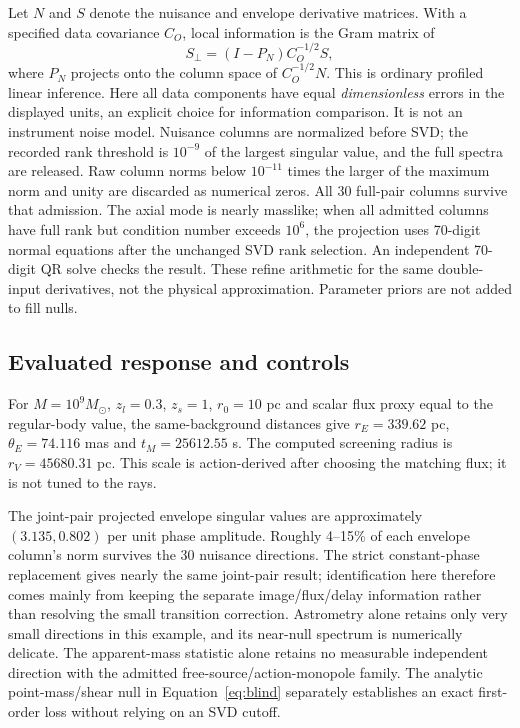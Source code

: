 \documentclass[11pt,a4paper]{article}
\begin{document}
Let $N$ and $S$ denote the nuisance and envelope derivative matrices.
With a specified data covariance $C_O$, local information is the Gram
matrix of
\begin{equation}
 S_\perp=(I-P_N)C_O^{-1/2}S,
\end{equation}
where $P_N$ projects onto the column space of $C_O^{-1/2}N$.
This is ordinary profiled linear inference. Here all data components
have equal \emph{dimensionless} errors in the displayed units, an
explicit choice for information comparison. It is not an instrument
noise model. Nuisance columns are normalized before SVD; the recorded
rank threshold is $10^{-9}$ of the largest singular value, and the full
spectra are released. Raw column norms below $10^{-11}$ times the larger
of the maximum norm and unity are discarded as numerical zeros.
All 30 full-pair columns survive that admission. The axial mode is nearly
masslike; when all admitted columns have full rank but condition number
exceeds $10^6$, the projection uses 70-digit normal equations after the
unchanged SVD rank selection. An independent 70-digit QR solve checks
the result. These refine arithmetic for the same double-input derivatives,
not the physical approximation. Parameter priors are not added to fill nulls.

\subsection{Evaluated response and controls}

For $M=10^9M_\odot$, $z_l=0.3$, $z_s=1$, $r_0=10$ pc and scalar
flux proxy equal to the regular-body value, the same-background
distances give $r_E=339.62$ pc, $\theta_E=74.116$ mas and
$t_M=25612.55$ s. The computed screening radius is $r_V=45680.31$ pc.
This scale is action-derived after choosing the matching flux; it is not
tuned to the rays.



The joint-pair projected envelope singular values are approximately
$(3.135,0.802)$ per unit phase amplitude. Roughly 4--15\% of each
envelope column's norm survives the 30 nuisance directions. The strict
constant-phase replacement gives nearly the same joint-pair result;
identification here therefore comes mainly from keeping the separate
image/flux/delay information rather than resolving the small transition
correction. Astrometry alone retains only very small directions in this
example, and its near-null spectrum is numerically delicate. The
apparent-mass statistic alone retains no measurable independent
direction with the admitted free-source/action-monopole family. The
analytic point-mass/shear null in Equation~\eqref{eq:blind} separately
establishes an exact first-order loss without relying on an SVD cutoff.
\end{document}
